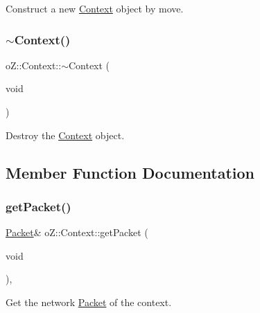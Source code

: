 Construct a new \mbox{\hyperlink{classo_z_1_1_context}{Context}} object by move. 

\mbox{\label{classo_z_1_1_context_afe2e01a552a7711772e4028f778703e8}} 
\subsubsection{\texorpdfstring{$\sim$Context()}{~Context()}}
{\footnotesize\ttfamily o\+Z\+::\+Context\+::$\sim$\+Context (\begin{DoxyParamCaption}\item[{void}]{ }\end{DoxyParamCaption})\hspace{0.3cm}{\ttfamily [default]}}



Destroy the \mbox{\hyperlink{classo_z_1_1_context}{Context}} object. 



\subsection{Member Function Documentation}
\mbox{\label{classo_z_1_1_context_ad2814c8e2b850cb4c5a70a964dbd3d58}} 
\subsubsection{\texorpdfstring{getPacket()}{getPacket()}\hspace{0.1cm}{\footnotesize\ttfamily [1/2]}}
{\footnotesize\ttfamily \mbox{\hyperlink{classo_z_1_1_packet}{Packet}}\& o\+Z\+::\+Context\+::get\+Packet (\begin{DoxyParamCaption}\item[{void}]{ }\end{DoxyParamCaption})\hspace{0.3cm}{\ttfamily [inline]}, {\ttfamily [noexcept]}}



Get the network \mbox{\hyperlink{classo_z_1_1_packet}{Packet}} of the context. 

\mbox{\label{classo_z_1_1_context_a25918977b74de5fc3874d38a2f235ba2}} 
